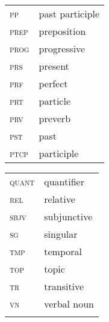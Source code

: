 \documentclass[output=paper,colorlinks,citecolor=brown]{langscibook}
\begin{document}
\begin{tabularx}{.45\textwidth}{lQ}
\textsc{pp} & past participle\\
\textsc{prep} & preposition\\
\textsc{prog} & progressive\\
\textsc{prs} & present\\
\textsc{prf} & perfect\\
\textsc{prt} & particle\\
\textsc{prv} & preverb\\
\textsc{pst} & past\\
\textsc{ptcp} & participle\\
\end{tabularx}
\begin{tabularx}{.45\textwidth}{lQ}
\textsc{quant} & quantifier\\
\textsc{rel} & relative\\
\textsc{sbjv} & subjunctive\\
\textsc{sg} & singular\\
\textsc{tmp} & temporal\\
\textsc{top} & topic\\
\textsc{tr} & transitive\\
\textsc{vn} & verbal noun\\
\\
\end{tabularx}
\end{document}
